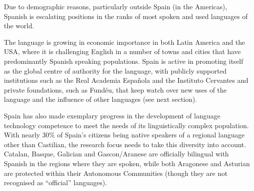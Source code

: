 \begin{multicols}{2}
%
%

Due to demographic reasons, particularly outside Spain (in the Americas), Spanish is escalating positions in the ranks of most spoken and used languages of the world.

The language is growing in economic importance in both Latin America and the USA, where it is challenging English in a number of towns and cities that have predominantly Spanish speaking populations.  Spain is active in promoting itself as the global centre of authority for the language, with publicly supported institutions such as the Real Academia Española and the Instituto Cervantes and private foundations, such as Fundéu, that keep watch over new uses of the language and the influence of other languages (see next section).

Spain has also made exemplary progress in the development of language technology competence to meet the needs of its linguistically complex population. With nearly 30\% of Spain’s citizens being native speakers of a regional language other than Castilian, the research focus needs to take this diversity into account. Catalan, Basque, Galician and Gascon/Aranese are officially bilingual with Spanish in the regions where they are spoken, while both Aragonese and Asturian are protected within their Autonomous Communities (though they are not recognised as “official” languages).


\end{multicols}
